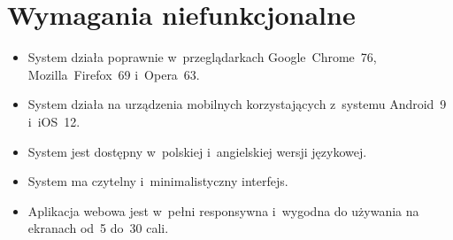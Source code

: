 \section{Wymagania niefunkcjonalne}\label{sec:nonfunctional-requirements}
\begin{itemize}
    \item System działa poprawnie w~przeglądarkach Google~Chrome~76, Mozilla~Firefox~69 i~Opera~63.
    \item System działa na urządzenia mobilnych korzystających z~systemu Android~9 i~iOS~12.
    \item System jest dostępny w~polskiej i~angielskiej wersji językowej.
    \item System ma czytelny i~minimalistyczny interfejs.
    \item Aplikacja webowa jest w~pełni responsywna i~wygodna do używania na ekranach od~5 do~30 cali.
\end{itemize}
\thispagestyle{normal}

